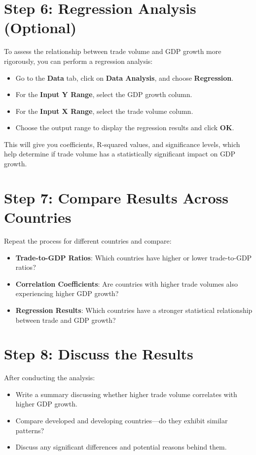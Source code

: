 \documentclass{article}
\begin{document}
\section{Step 6: Regression Analysis (Optional)}
To assess the relationship between trade volume and GDP growth more rigorously, you can perform a regression analysis:

\begin{itemize}
    \item Go to the \textbf{Data} tab, click on \textbf{Data Analysis}, and choose \textbf{Regression}.
    \item For the \textbf{Input Y Range}, select the GDP growth column.
    \item For the \textbf{Input X Range}, select the trade volume column.
    \item Choose the output range to display the regression results and click \textbf{OK}.
\end{itemize}

This will give you coefficients, R-squared values, and significance levels, which help determine if trade volume has a statistically significant impact on GDP growth.

\section{Step 7: Compare Results Across Countries}
Repeat the process for different countries and compare:

\begin{itemize}
    \item \textbf{Trade-to-GDP Ratios}: Which countries have higher or lower trade-to-GDP ratios?
    \item \textbf{Correlation Coefficients}: Are countries with higher trade volumes also experiencing higher GDP growth?
    \item \textbf{Regression Results}: Which countries have a stronger statistical relationship between trade and GDP growth?
\end{itemize}

\section{Step 8: Discuss the Results}
After conducting the analysis:

\begin{itemize}
    \item Write a summary discussing whether higher trade volume correlates with higher GDP growth.
    \item Compare developed and developing countries—do they exhibit similar patterns?
    \item Discuss any significant differences and potential reasons behind them.
\end{itemize}
\end{document}
